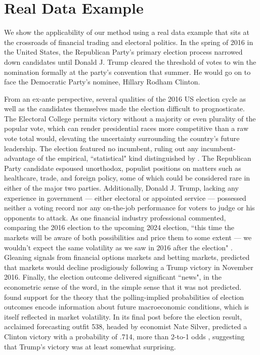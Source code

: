 \documentclass[11pt,3p,review,authoryear]{elsarticle}
\theoremstyle{definition}
\begin{document}
\clearpage 

\section{Real Data Example}

We show the applicability of our method using a real data example that sits at the crossroads of financial trading and electoral politics.  In the spring of 2016 in the United States, the Republican Party's primary election process narrowed down candidates until Donald J. Trump cleared the threshold of votes to win the nomination formally at the party's convention that summer.  He would go on to face the Democratic Party's nominee, Hillary Rodham Clinton.   

From an ex-ante perspective, several qualities of the 2016 US election cycle as well as the candidates themselves made the election difficult to prognosticate.  The Electoral College permits victory without a majority or even plurality of the popular vote, which can render presidential races more competitive than a raw vote total would, elevating the uncertainty surrounding the country's future leadership.  The election featured no incumbent, ruling out any incumbent-advantage of the empirical, ``statistical" kind distinguished by \citet{mayhew2008incumbency}.  The Republican Party candidate espoused unorthodox, populist positions on matters such as healthcare, trade, and foreign policy, some of which could be considered rare in either of the major two parties.  Additionally, Donald J. Trump, lacking any experience in government --- either electoral or appointed service --- possessed neither a voting record nor any on-the-job performance for voters to judge or his opponents to attack. As one financial industry professional commented, comparing the 2016 election to the upcoming 2024 election, ``this time the markets will be aware of both possibilities and price them to some extent — we wouldn’t expect the same volatility as we saw in 2016 after the election" \citep{News_2024}. Gleaning signals from financial options markets and betting markets, \citet{wolfers2016financial} predicted that markets would decline prodigiously following a Trump victory in November 2016.  Finally, the election outcome delivered significant ``news", in the econometric sense of the word, in the simple sense that it was not predicted.  \citet{goodell2013us} found support for the theory that the polling-implied probabilities of election outcomes encode information about future macroeconomic conditions, which is itself reflected in market volatility.  In its final post before the election result, acclaimed forecasting outfit 538, headed by economist Nate Silver, predicted a Clinton victory with a probability of .714, more than 2-to-1 odds \citep{Silver_2016}, suggesting that Trump's victory was at least somewhat surprising.  
\end{document}
